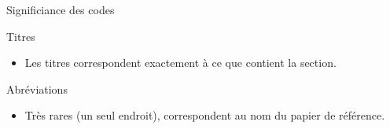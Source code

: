 \begin{frame}{Significiance des codes}
  \begin{block}{Titres}
    \begin{itemize}
    \item<pro@1-> Les titres correspondent exactement à ce que contient la
      section.
    \end{itemize}
  \end{block}

  \begin{block}{Abréviations}
    \begin{itemize}
    \item Très rares (un seul endroit), correspondent au nom du papier
      de référence.
    \end{itemize}
  \end{block}
\end{frame}
